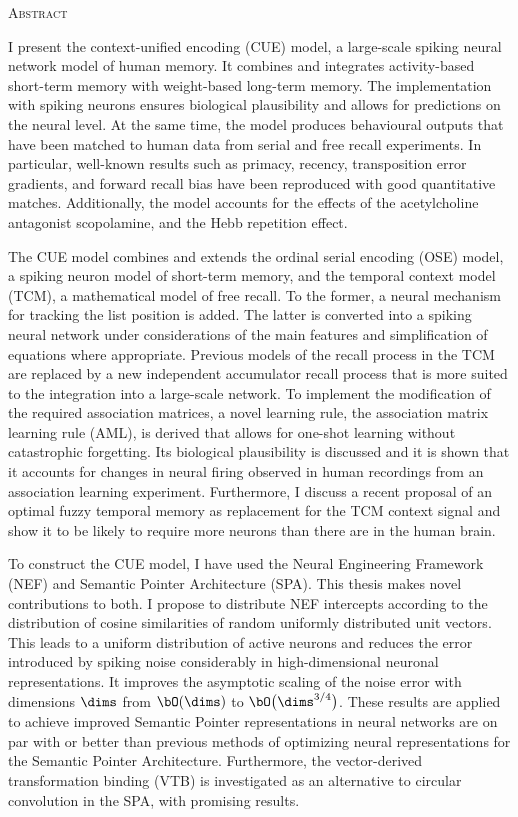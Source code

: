 \cleardoublepage


\begin{center}\textsc{Abstract}\end{center}
I present the context-unified encoding (CUE) model, a large-scale spiking neural network model of human memory.
It combines and integrates activity-based short-term memory with weight-based long-term memory.
The implementation with spiking neurons ensures biological plausibility and allows for predictions on the neural level.
At the same time, the model produces behavioural outputs that have been matched to human data from serial and free recall experiments.
In particular, well-known results such as primacy, recency, transposition error gradients, and forward recall bias have been reproduced with good quantitative matches.
Additionally, the model accounts for the effects of the acetylcholine antagonist scopolamine, and the Hebb repetition effect.

The CUE model combines and extends the ordinal serial encoding (OSE) model, a spiking neuron model of short-term memory, and the temporal context model (TCM), a mathematical model of free recall.
To the former, a neural mechanism for tracking the list position is added.
The latter is converted into a spiking neural network under considerations of the main features and simplification of equations where appropriate.
Previous models of the recall process in the TCM are replaced by a new independent accumulator recall process that is more suited to the integration into a large-scale network.
To implement the modification of the required association matrices, a novel learning rule, the association matrix learning rule (AML), is derived that allows for one-shot learning without catastrophic forgetting.
Its biological plausibility is discussed and it is shown that it accounts for changes in neural firing observed in human recordings from an association learning experiment.
Furthermore, I discuss a recent proposal of an optimal fuzzy temporal memory as replacement for the TCM context signal and show it to be likely to require more neurons than there are in the human brain.

To construct the CUE model, I have used the Neural Engineering Framework (NEF) and Semantic Pointer Architecture (SPA).
This thesis makes novel contributions to both.
I propose to distribute NEF intercepts according to the distribution of cosine similarities of random uniformly distributed unit vectors.
This leads to a uniform distribution of active neurons and reduces the error introduced by spiking noise considerably in high-dimensional neuronal representations.
It improves the asymptotic scaling of the noise error with dimensions $\dims$ from $\bO(\dims)$ to $\bO\big(\dims^{3/4}\big)$.
These results are applied to achieve improved Semantic Pointer representations in neural networks are on par with or better than previous methods of optimizing neural representations for the Semantic Pointer Architecture.
Furthermore, the vector-derived transformation binding (VTB) is investigated as an alternative to circular convolution in the SPA, with promising results.


